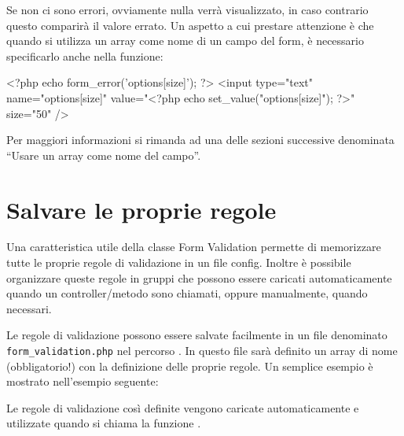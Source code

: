 Se non ci sono errori, ovviamente nulla verrà visualizzato, in caso contrario questo comparirà il valore errato. Un aspetto a cui prestare attenzione è che quando si utilizza un array come nome di un campo del form, è necessario specificarlo anche nella funzione:

\begin{code}
<?php echo form_error('options[size]'); ?>
<input type="text" name="options[size]" value="<?php echo set_value("options[size]"); ?>" size="50" />
\end{code}

Per maggiori informazioni si rimanda ad una delle sezioni successive denominata ``Usare un array come nome del campo''.

\section*{Salvare le proprie regole}
Una caratteristica utile della classe Form Validation permette di memorizzare tutte le proprie regole di validazione in un file config. Inoltre è possibile organizzare queste regole in gruppi che possono essere caricati automaticamente quando un controller/metodo sono chiamati, oppure manualmente, quando necessari.

Le regole di validazione possono essere salvate facilmente in un file denominato \verb|form_validation.php| nel percorso . In questo file sarà definito un array di nome (obbligatorio!)  con la definizione delle proprie regole. Un semplice esempio è mostrato nell'esempio seguente:


Le regole di validazione così definite vengono caricate automaticamente e utilizzate quando si chiama la funzione .

